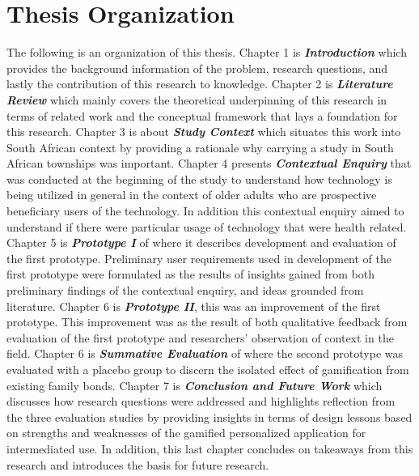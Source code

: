 \section{Thesis Organization}
The following is an organization of this thesis. Chapter 1 is \emph{\textbf{Introduction}} which provides the background information of the problem, research questions, and lastly the contribution of this research to knowledge. Chapter 2 is \emph{\textbf{Literature Review}} which mainly covers  the theoretical underpinning of this research in terms of related work and the conceptual framework that lays a foundation for this research. Chapter 3 is about \emph{\textbf{Study Context}} which situates this work into South African context by providing a rationale why carrying  a study in South African townships was important. Chapter 4 presents \emph{\textbf{Contextual Enquiry}} that was conducted at the beginning of the study to understand how technology is being utilized in general in the context of older adults who are prospective beneficiary users of the technology. In addition this contextual enquiry aimed to understand if there were particular usage of technology that were health related. Chapter 5 is \emph{\textbf{Prototype I}} of where it describes development and evaluation of the first prototype. Preliminary user requirements used in development of the first prototype were formulated as the results of insights gained from both preliminary findings of the contextual enquiry, and ideas grounded from literature. Chapter 6 is \emph{\textbf{Prototype II}}, this was an improvement of the first prototype. This improvement was as the result of both qualitative feedback from evaluation of the first prototype and researchers' observation of context in the field. Chapter 6 is \emph{\textbf{Summative Evaluation}} of where the second prototype was evaluated with a placebo group to discern the isolated effect of gamification from existing family bonds. Chapter 7 is \emph{\textbf{Conclusion and Future Work}} which discusses how research questions were addressed and highlights reflection from the three evaluation studies by providing insights in terms of design lessons based on strengths and weaknesses of the gamified personalized application for intermediated use. In addition, this last chapter concludes on takeaways from this research and introduces the basis for future research.         
\begin{flushright}
\end{flushright}
